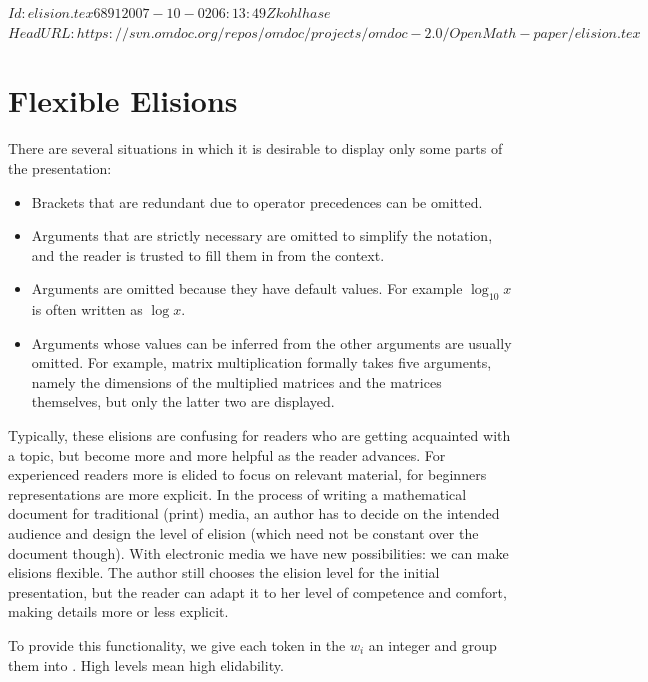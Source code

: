 \svnInfo $Id: elision.tex 6891 2007-10-02 06:13:49Z kohlhase $
\svnKeyword $HeadURL: https://svn.omdoc.org/repos/omdoc/projects/omdoc-2.0/OpenMath-paper/elision.tex $
\section{Flexible Elisions}\label{sec:elision}

There are several situations in which it is desirable to display only some parts of the
presentation:
\begin{itemize}
\item Brackets that are redundant due to operator precedences can be omitted.
\item Arguments that are strictly necessary are omitted to simplify the notation, and the
  reader is trusted to fill them in from the context.
\item Arguments are omitted because they have default values. For example $\log_{10}x$ is
  often written as $\log x$.
\item Arguments whose values can be inferred from the other arguments are usually
  omitted. For example, matrix multiplication formally takes five arguments, namely the
  dimensions of the multiplied matrices and the matrices themselves, but only the latter
  two are displayed.
\end{itemize}

Typically, these elisions are confusing for readers who are getting acquainted with a
topic, but become more and more helpful as the reader advances.  For experienced readers
more is elided to focus on relevant material, for beginners representations are more
explicit.  In the process of writing a mathematical document for traditional (print)
media, an author has to decide on the intended audience and design the level of elision
(which need not be constant over the document though). With electronic media we have new
possibilities: we can make elisions flexible. The author still chooses the elision level
for the initial presentation, but the reader can adapt it to her level of competence and
comfort, making details more or less explicit.

To provide this functionality, we give each token in the $w_i$ an integer
{} and group them into {}. High
levels mean high elidability. 

